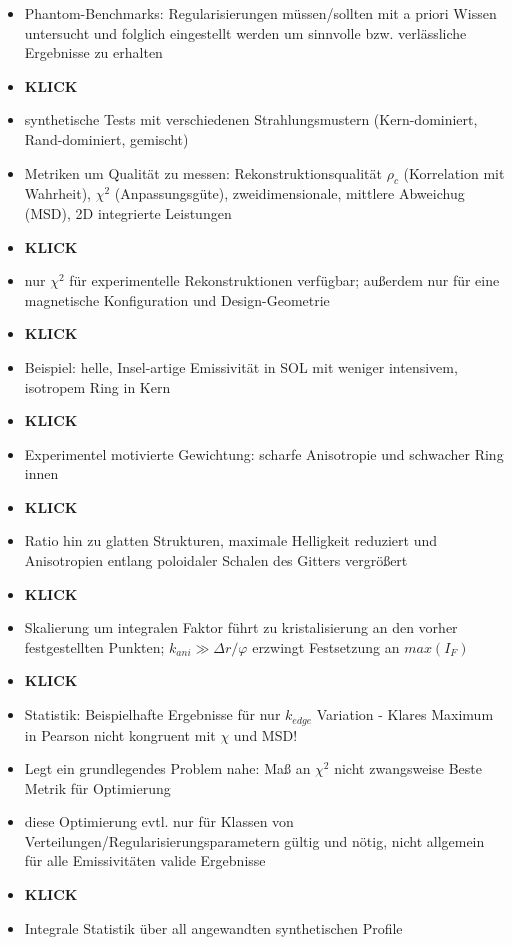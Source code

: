 \documentclass[11pt,a4paper]{article}
\begin{document}
\begin{itemize}
\item Phantom-Benchmarks: Regularisierungen müssen/sollten mit a priori Wissen untersucht und folglich eingestellt werden um sinnvolle bzw. verlässliche Ergebnisse zu erhalten
\item \textbf{KLICK}
\item synthetische Tests mit verschiedenen Strahlungsmustern (Kern-dominiert, Rand-dominiert, gemischt)
\item Metriken um Qualität zu messen: Rekonstruktionsqualität $\rho_c$ (Korrelation mit Wahrheit), $\chi^2$ (Anpassungsgüte), zweidimensionale, mittlere Abweichug (MSD), 2D integrierte Leistungen
\item \textbf{KLICK}
\item nur $\chi^2$ für experimentelle Rekonstruktionen verfügbar; außerdem nur für eine magnetische Konfiguration und Design-Geometrie
\item \textbf{KLICK}
\item Beispiel: helle, Insel-artige Emissivität in SOL mit weniger intensivem, isotropem Ring in Kern
\item \textbf{KLICK}
\item Experimentel motivierte Gewichtung: scharfe Anisotropie und schwacher Ring innen
\item \textbf{KLICK}
\item Ratio hin zu glatten Strukturen, maximale Helligkeit reduziert und Anisotropien entlang poloidaler Schalen des Gitters vergrößert
\item \textbf{KLICK}
\item Skalierung um integralen Faktor führt zu kristalisierung an den vorher festgestellten Punkten; $k_{ani}\gg\Delta r/\varphi$ erzwingt Festsetzung an $max(I_{F})$
\item \textbf{KLICK}
\item Statistik: Beispielhafte Ergebnisse für nur $k_{edge}$ Variation - Klares Maximum in Pearson nicht kongruent mit $\chi$ und MSD!
\item Legt ein grundlegendes Problem nahe: Maß an $\chi^2$ nicht zwangsweise Beste Metrik für Optimierung
\item diese Optimierung evtl. nur für Klassen von Verteilungen/Regularisierungsparametern gültig und nötig, nicht allgemein für alle Emissivitäten valide Ergebnisse
\item \textbf{KLICK}
\item Integrale Statistik über all angewandten synthetischen Profile

\end{itemize}
\end{document}
